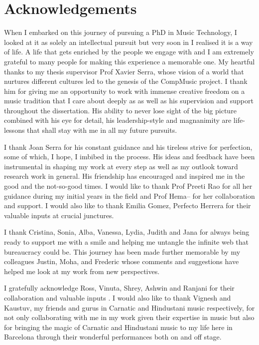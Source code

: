 \chapter*{Acknowledgements}

When I embarked on this journey of pursuing a PhD in Music Technology, I looked at it as solely an intellectual pursuit but very soon in I realised it is a way of life. A life that gets enriched by the people we engage with and I am extremely grateful to many people for making this experience a memorable one. My heartful thanks to my thesis supervisor Prof Xavier Serra, whose vision of a world that nurtures different cultures led to the genesis of the CompMusic project. I thank him for giving me an opportunity to work with immense creative freedom on a music tradition that I care about deeply as as well as his supervision and support throughout the dissertation. His ability to never lose sight of the big picture combined with his eye for detail, his leadership-style and magnanimity are life-lessons that shall stay with me in all my future pursuits.

I thank Joan Serra for his constant guidance and his tireless strive for perfection, some of which, I hope, I imbibed in the process. His ideas and feedback have been instrumental in shaping my work at every step as well as my outlook toward research work in general. His friendship has encouraged and inspired me in the good and the not-so-good times. I would like to thank Prof Preeti Rao for all her guidance during my initial years in the field and Prof Hema-- for her collaboration and support. I would also like to thank Emilia Gomez, Perfecto Herrera for their  valuable inputs at crucial junctures.

I thank Cristina, Sonia, Alba, Vanessa, Lydia, Judith and Jana for always being ready to support me with a smile and helping me untangle the infinite web that bureaucracy could be. This journey has been made further memorable by my colleagues Justin, Moha, and Frederic whose comments and suggestions have helped me look at my work from new perspectives. 

I gratefully acknowledge Ross, Vinuta, Shrey, Ashwin and Ranjani for their collaboration and valuable inputs . I would also like to thank Vignesh and Kaustuv, my friends and gurus in Carnatic and Hindustani music respectively, for not only collaborating with me in my work given their expertise in music but also for bringing the magic of Carnatic and Hindustani music to my life here in Barcelona through their wonderful performances both on and off stage.

